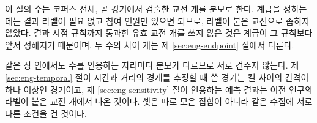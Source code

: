 이 절의 수는 코퍼스 전체, 곧 \numMatchesTotal{} 경기에서 검출한 교전 \numEngDetected{}개를 분모로 한다. 계급을 정하는 데는 결과 라벨이 필요 없고 참여 인원만 있으면 되므로, 라벨이 붙은 교전으로 좁히지 않았다. 결과 시점 규칙까지 통과한 유효 교전 \numEngValid{}개를 쓰지 않은 것은 계급이 그 규칙보다 앞서 정해지기 때문이며, 두 수의 차이 \numEngInvalid{}개는 제 \ref{sec:eng-endpoint} 절에서 다룬다.

같은 장 안에서도 수를 인용하는 자리마다 분모가 다르므로 서로 견주지 않는다. 제 \ref{sec:eng-temporal} 절이 시간과 거리의 경계를 추정할 때 쓴 \numMatchesDef{} 경기는 킬 사이의 간격이 하나 이상인 경기이고, 제 \ref{sec:eng-sensitivity} 절이 인용하는 예측 결과는 이전 연구의 라벨이 붙은 교전 \numEngLineage{}개에서 나온 것이다. 셋은 따로 모은 집합이 아니라 같은 수집에 서로 다른 조건을 건 것이다.
